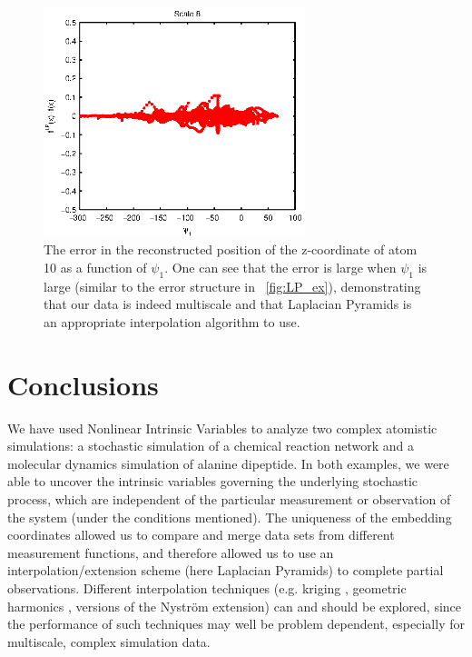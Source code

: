 \begin{figure}[t]
    \centering
    \includegraphics[width=3in]{fig10b}
    \caption[Error in reconstructed alanine dipeptide configurations]{The error in the reconstructed position of the z-coordinate of atom 10 as a function of $\psi_1$. One can see that the error is large when $\psi_1$ is large (similar to the error structure in \fig~\ref{fig:LP_ex}), demonstrating that our data is indeed multiscale and that Laplacian Pyramids is an appropriate interpolation algorithm to use.}
    \label{fig:LapPyr_ala2_errors}
\end{figure}

\section{Conclusions} \label{sec:conclusions}
%
We have used Nonlinear Intrinsic Variables to analyze two complex atomistic simulations: a stochastic simulation of a chemical reaction network and a molecular dynamics simulation of alanine dipeptide.
%
In both examples, we were able to uncover the intrinsic variables governing the underlying stochastic process, which are independent
of the particular measurement or observation  of the system (under the conditions mentioned).
%
The uniqueness of the embedding coordinates allowed us to compare and merge data sets from different measurement functions,
and therefore allowed us to use an interpolation/extension scheme (here Laplacian Pyramids) to complete partial observations.
%
Different interpolation techniques (e.g. kriging \cite{matheron1963principles, matheron1973intrinsic}, geometric harmonics \cite{coifman2006geometric},  versions of the Nystr\"{o}m extension) can and should
be explored, since the performance of such techniques may well be problem dependent, especially for multiscale, complex simulation data.

